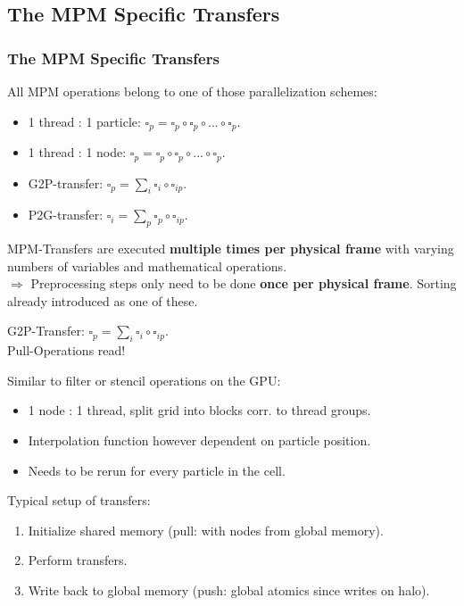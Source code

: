 \documentclass{beamer}
\begin{document}
\subsection{The MPM Specific Transfers}
\begin{frame}
\frametitle{The MPM Specific Transfers}
All MPM operations belong to one of those parallelization schemes:
\begin{itemize}
 \item 1 thread : 1 particle: $\square_p = \square_p \circ \square_p \circ ... \circ \square_p$.
 \item 1 thread : 1 node: $\square_p = \square_p \circ \square_p \circ ... \circ \square_p$.
 \item G2P-transfer: $\square_p = \sum_i \square_i \circ \square_{ip}.$
 \item P2G-transfer: $\square_i = \sum_p \square_p \circ \square_{ip}.$
\end{itemize}
\vfill
MPM-Transfers are executed \textbf{multiple times per physical frame} with varying numbers of variables and mathematical operations.\\\vspace{5}
$\Rightarrow$ Preprocessing steps only need to be done \textbf{once per physical frame}. Sorting already introduced as one of these.
\end{frame}
\begin{frame}
\begin{minipage}{\textwidth}
  G2P-Transfer: $\square_p = \sum_i \square_i \circ \square_{ip}.$\\
  
  Pull-Operations read!
\end{minipage}
\end{frame}
\begin{frame}
Similar to filter or stencil operations on the GPU:
\begin{itemize}
  \item 1 node : 1 thread, split grid into blocks corr. to thread groups.
  \item Interpolation function however dependent on particle position.
  \item Needs to be rerun for every particle in the cell.
\end{itemize}
\vfill
Typical setup of transfers:
\begin{enumerate}
  \item Initialize shared memory (pull: with nodes from global memory).
  \item Perform transfers.
  \item Write back to global memory (push: global atomics since writes on halo).
\end{enumerate}
\end{frame}
\end{document}
